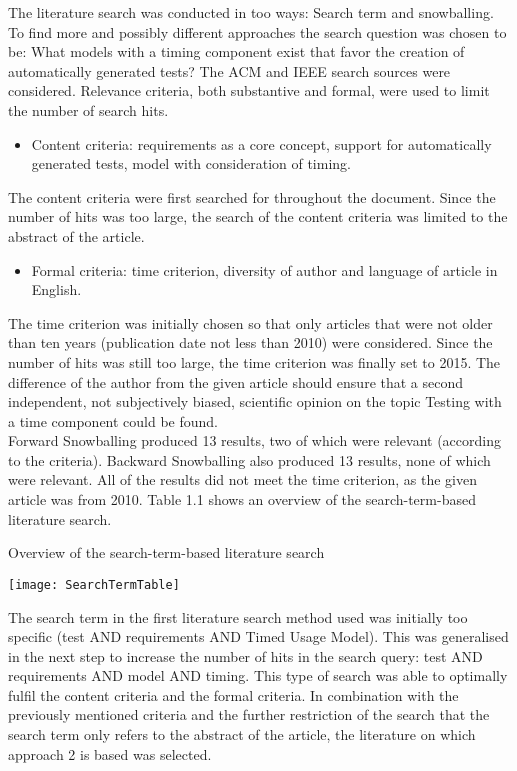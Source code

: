 The literature search was conducted in too ways: Search term and snowballing.
To find more and possibly different approaches the search question
was chosen to be: \textquotedbl What models with a timing component
exist that favor the creation of automatically generated tests?\textquotedbl{}
The ACM \cite*{acm} and IEEE \cite*{ieee} search sources were considered.
Relevance criteria, both substantive and formal, were used to limit
the number of search hits. 
\begin{itemize}
\item Content criteria: \textquotedbl requirements as a core concept\textquotedbl ,
\textquotedbl support for automatically generated tests\textquotedbl ,
\textquotedbl model with consideration of timing\textquotedbl . 
\end{itemize}
The content criteria were first searched for throughout the document.
Since the number of hits was too large, the search of the content
criteria was limited to the abstract of the article. 
\begin{itemize}
\item Formal criteria: time criterion, diversity of author and language
of article in English. 
\end{itemize}
The time criterion was initially chosen so that only articles that
were not older than ten years (publication date not less than 2010)
were considered. Since the number of hits was still too large, the
time criterion was finally set to 2015. The difference of the author
from the given article should ensure that a second independent, not
subjectively biased, scientific opinion on the topic \textquotedbl Testing
with a time component\textquotedbl{} could be found.\\
Forward Snowballing produced 13 results, two of which were relevant
(according to the criteria). Backward Snowballing also produced 13
results, none of which were relevant. All of the results did not meet
the time criterion, as the given article was from 2010. Table 1.1
shows an overview of the search-term-based literature search.\\
 
\begin{table}[h]
\caption{Overview of the search-term-based literature search}

\centering{}\texttt{[image: SearchTermTable]} 
\end{table}
The search term in the first literature search method used was initially
too specific (test AND requirements AND \textquotedbl Timed Usage
Model\textquotedbl ). This was generalised in the next step to increase
the number of hits in the search query: \textquotedbl test AND requirements
AND model AND timing\textquotedbl . This type of search was able to
optimally fulfil the content criteria and the formal criteria. In
combination with the previously mentioned criteria and the further
restriction of the search that the search term only refers to the
abstract of the article, the literature on which approach 2 is based
was selected.

